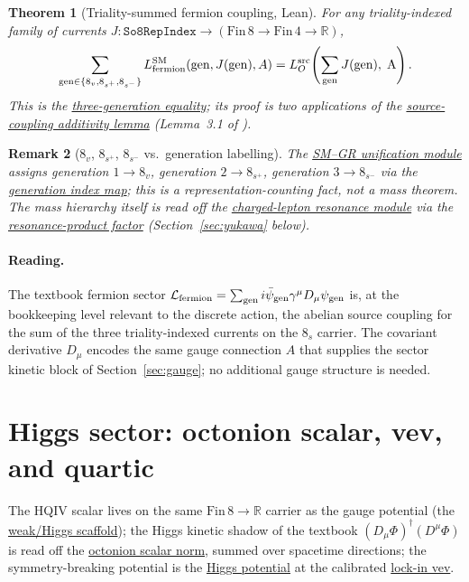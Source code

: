 \documentclass[11pt]{amsart}
\newtheorem{theorem}{Theorem}[section]
\newtheorem{remark}[theorem]{Remark}
\begin{document}
\begin{theorem}[Triality-summed fermion coupling, Lean]
\label{thm:three-generations}
For any triality-indexed family of currents $J:\texttt{So8RepIndex}\to(\mathrm{Fin}\,8\to\mathrm{Fin}\,4\to\mathbb{R})$,
\[
\sum_{\mathrm{gen}\in\{8_v,8_{s^+},8_{s^-}\}} L_{\rm fermion}^{\rm SM}(\mathrm{gen},J(\mathrm{gen}),A)
= L_O^{\rm src}\!\left(\sum_{\rm gen} J(\rm gen),\;A\right).
\]
This is the \hyperref[lean:three-gen]{three-generation equality}; its proof
is two applications of the
\hyperref[lean:J-add]{source-coupling additivity lemma}
(Lemma~3.1 of \cite{hqiv-oct-action-paper}).
\end{theorem}

\begin{remark}[$8_v$, $8_{s^+}$, $8_{s^-}$ vs.\ generation labelling]
The \hyperref[lean:sm-gr]{SM--GR unification module} assigns generation
$1\to 8_v$, generation $2\to 8_{s^+}$, generation $3\to 8_{s^-}$ via the
\hyperref[lean:sm-gen-index]{generation index map}; this is a
representation-counting fact, not a mass theorem. The mass hierarchy itself
is read off the \hyperref[lean:lepton-resonance]{charged-lepton resonance
module} via the \hyperref[lean:resonance-product]{resonance-product factor}
(Section~\ref{sec:yukawa} below).
\end{remark}

\paragraph{Reading.}
The textbook fermion sector
$\mathcal{L}_{\rm fermion}=\sum_{\rm gen}i\bar\psi_{\rm gen}\gamma^\mu D_\mu\psi_{\rm gen}$
is, at the bookkeeping level relevant to the discrete action, the abelian
source coupling for the sum of the three triality-indexed currents on
the $8_s$ carrier. The covariant derivative $D_\mu$ encodes the same gauge
connection $A$ that supplies the sector kinetic block of
Section~\ref{sec:gauge}; no additional gauge structure is needed.

\section{Higgs sector: octonion scalar, vev, and quartic}
\label{sec:higgs}

The HQIV scalar lives on the same $\mathrm{Fin}\,8\to\mathbb{R}$ carrier as
the gauge potential (the \hyperref[lean:weak-higgs]{weak/Higgs scaffold});
the Higgs kinetic shadow of the textbook $(D_\mu\Phi)^\dagger(D^\mu\Phi)$ is
read off the \hyperref[lean:scalar-norm]{octonion scalar norm}, summed over
spacetime directions; the symmetry-breaking potential is the
\hyperref[lean:higgs-pot]{Higgs potential} at the calibrated
\hyperref[lean:lockin-vev]{lock-in vev}.
\end{document}

